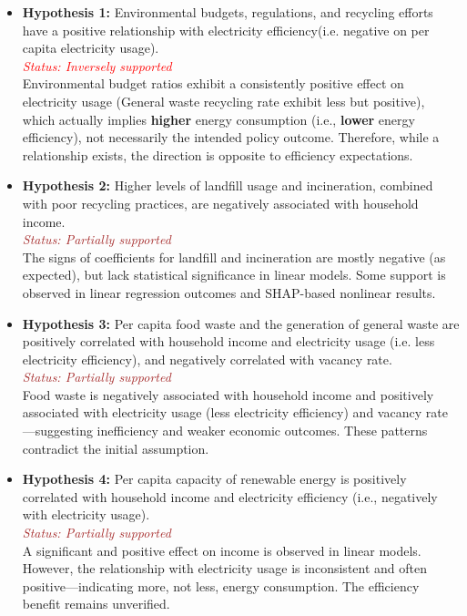 \documentclass{article}
\begin{document}
\begin{itemize}
    \item \textbf{Hypothesis 1:} Environmental budgets, regulations, and recycling efforts have a positive relationship with electricity efficiency(i.e. negative on per capita electricity usage).\\
    \textcolor{red}{\textit{Status: Inversely supported}} \\
    Environmental budget ratios exhibit a consistently positive effect on electricity usage (General waste recycling rate exhibit less but positive), which actually implies \textbf{higher} energy consumption (i.e., \textbf{lower} energy efficiency), not necessarily the intended policy outcome. Therefore, while a relationship exists, the direction is opposite to efficiency expectations.

    \item \textbf{Hypothesis 2:} Higher levels of landfill usage and incineration, combined with poor recycling practices, are negatively associated with household income.\\
    \textcolor{brown}{\textit{Status: Partially supported}} \\
    The signs of coefficients for landfill and incineration are mostly negative (as expected), but lack statistical significance in linear models. Some support is observed in linear regression outcomes and SHAP-based nonlinear results.

    \item \textbf{Hypothesis 3:} Per capita food waste and the generation of general waste are positively correlated with household income and electricity usage (i.e. less electricity efficiency), and negatively correlated with vacancy rate.\\
    \textcolor{brown}{\textit{Status: Partially supported}} \\
    Food waste is negatively associated with household income and positively associated with electricity usage (less electricity efficiency) and vacancy rate—suggesting inefficiency and weaker economic outcomes. These patterns contradict the initial assumption.

    \item \textbf{Hypothesis 4:} Per capita capacity of renewable energy is positively correlated with household income and electricity efficiency (i.e., negatively with electricity usage).\\
    \textcolor{brown}{\textit{Status: Partially supported}} \\
    A significant and positive effect on income is observed in linear models. However, the relationship with electricity usage is inconsistent and often positive—indicating more, not less, energy consumption. The efficiency benefit remains unverified.
\end{itemize}
\end{document}
